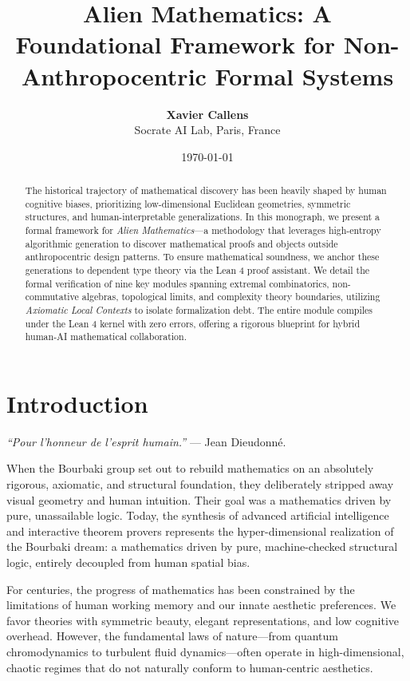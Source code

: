 \documentclass[11pt,a4paper]{article}
\title{\textbf{Alien Mathematics: A Foundational Framework for Non-Anthropocentric Formal Systems}}
\author{\textbf{Xavier Callens} \\ Socrate AI Lab, Paris, France}
\date{\today}
\begin{document}
\maketitle

\begin{abstract}
The historical trajectory of mathematical discovery has been heavily shaped by human cognitive biases, prioritizing low-dimensional Euclidean geometries, symmetric structures, and human-interpretable generalizations. In this monograph, we present a formal framework for \textit{Alien Mathematics}---a methodology that leverages high-entropy algorithmic generation to discover mathematical proofs and objects outside anthropocentric design patterns. To ensure mathematical soundness, we anchor these generations to dependent type theory via the Lean 4 proof assistant. We detail the formal verification of nine key modules spanning extremal combinatorics, non-commutative algebras, topological limits, and complexity theory boundaries, utilizing \textit{Axiomatic Local Contexts} to isolate formalization debt. The entire module compiles under the Lean 4 kernel with zero errors, offering a rigorous blueprint for hybrid human-AI mathematical collaboration.
\end{abstract}

\section{Introduction}
\textit{``Pour l'honneur de l'esprit humain.''} --- Jean Dieudonn\'e.

When the Bourbaki group set out to rebuild mathematics on an absolutely rigorous, axiomatic, and structural foundation, they deliberately stripped away visual geometry and human intuition. Their goal was a mathematics driven by pure, unassailable logic. Today, the synthesis of advanced artificial intelligence and interactive theorem provers represents the hyper-dimensional realization of the Bourbaki dream: a mathematics driven by pure, machine-checked structural logic, entirely decoupled from human spatial bias.

For centuries, the progress of mathematics has been constrained by the limitations of human working memory and our innate aesthetic preferences. We favor theories with symmetric beauty, elegant representations, and low cognitive overhead. However, the fundamental laws of nature---from quantum chromodynamics to turbulent fluid dynamics---often operate in high-dimensional, chaotic regimes that do not naturally conform to human-centric aesthetics.
\end{document}

